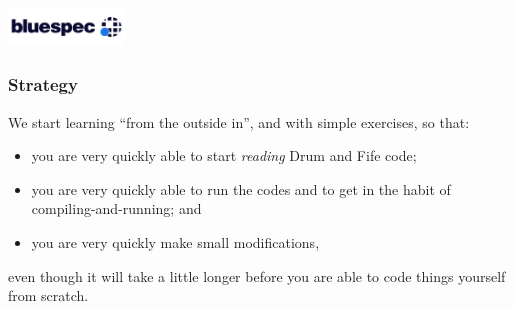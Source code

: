 



\date{L3: Structure of BSV Programs}





\begin{frame}
 \titlepage

 \begin{center}
  \includegraphics[height=1cm]{../Figures/Bluespec_Logo_2022-10}
 \end{center}

\end{frame}





\begin{frame}
\frametitle{Strategy}

\footnotesize

We start learning {\BSV} ``from the outside in'', and with simple
exercises, so that:

\vspace{2ex}

\begin{itemize}

 \item you are very quickly able to start \emph{reading} Drum and Fife code;

 \item you are very quickly able to run the codes and to get in the
       habit of compiling-and-running; and

 \item you are very quickly make small modifications,

\end{itemize}

\vspace{2ex}

even though it will take a little longer before you are able to code
things yourself from scratch.

\end{frame}

